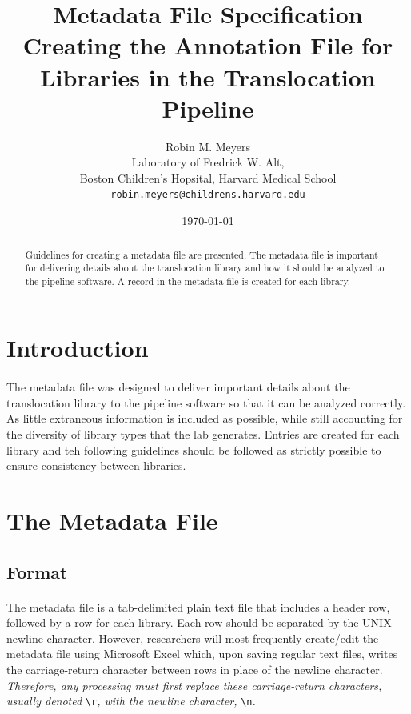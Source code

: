 \documentclass{article}
\begin{document}
\title{Metadata File Specification \\ \large Creating the Annotation File for Libraries in the Translocation Pipeline}
\author{Robin M. Meyers\\
  Laboratory of Fredrick W. Alt,\\
  Boston Children's Hopsital, Harvard Medical School\\
  \href{mailto:robin.meyers@childrens.harvard.edu}{\texttt{robin.meyers@childrens.harvard.edu}}}
\date{\today}
\maketitle

\begin{abstract}
Guidelines for creating a metadata file are presented. The metadata file is important for delivering details about the translocation library and how it should be analyzed to the pipeline software. A record in the metadata file is created for each library.
\end{abstract}

\section{Introduction}
\paragraph{}
The metadata file was designed to deliver important details about the translocation library to the pipeline software so that it can be analyzed correctly. As little extraneous information is included as possible, while still accounting for the diversity of library types that the lab generates. Entries are created for each library and teh following guidelines should be followed as strictly possible to ensure consistency between libraries.

\section{The Metadata File}
\subsection{Format}
\paragraph{} The metadata file is a tab-delimited plain text file that includes a header row, followed by a row for each library. Each row should be separated by the UNIX newline character. However, researchers will most frequently create/edit the metadata file using Microsoft Excel which, upon saving regular text files, writes the carriage-return character between rows in place of the newline character. \emph{Therefore, any processing must first replace these carriage-return characters, usually denoted} \texttt{\textbackslash{}r}\emph{, with the newline character,} \texttt{\textbackslash{}n}\emph{.}
\end{document}

